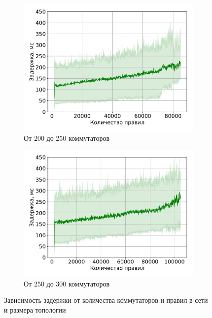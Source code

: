 \documentclass[../thesis.tex]{subfiles}
\begin{document}
\begin{figure}
\begin{subfigure}[b]{0.49\textwidth}
  \centering
  \includegraphics[width=1.0\textwidth]{figures/experiments/delay_by_rules_200_250.pdf}
  \caption{От 200 до 250 коммутаторов} \label{fig:delay_by_rules_200_250}
\end{subfigure}
\begin{subfigure}[b]{0.49\textwidth}
  \centering
  \includegraphics[width=1.0\textwidth]{figures/experiments/delay_by_rules_250_300.pdf}
  \caption{От 250 до 300 коммутаторов} \label{fig:delay_by_rules_250_300}
\end{subfigure}
\caption{Зависимость задержки от количества коммутаторов и правил в сети и размера топологии} \label{fig:delay_by_rules}
\end{figure}
\end{document}
